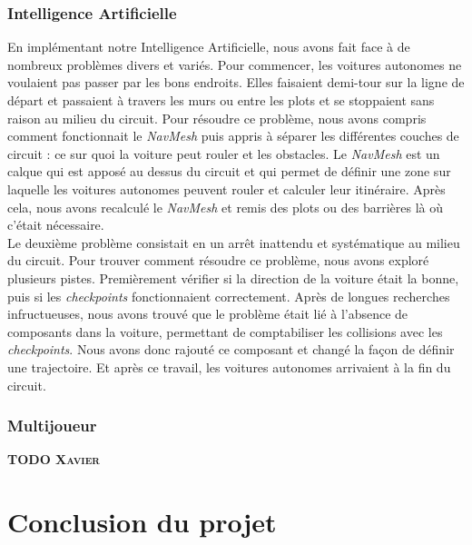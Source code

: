 \documentclass[a4paper,12pt]{article}
\newcommand{\AI}{Intelligence Artificielle}
\begin{document}
            \subsubsection{\AI}
                En implémentant notre \AI, nous avons fait face à de nombreux problèmes divers et variés. Pour 
                commencer, les voitures autonomes ne voulaient pas passer par les bons endroits. Elles 
                faisaient demi-tour sur la ligne de départ et passaient à travers les murs ou entre les 
                plots et se stoppaient sans raison au milieu du circuit. Pour résoudre ce problème, nous
                avons compris comment fonctionnait le \textit{NavMesh} puis appris à séparer les 
                différentes couches de circuit : ce sur quoi la voiture peut rouler et les obstacles. Le 
                \textit{NavMesh} est un calque qui est apposé au dessus du circuit et qui permet de
                définir une zone sur laquelle les voitures autonomes peuvent rouler et calculer leur
                itinéraire. Après cela, nous avons recalculé le \textit{NavMesh} et remis des plots
                ou des barrières là où c'était nécessaire.\\
                Le deuxième problème consistait en un arrêt inattendu et systématique au milieu du 
                circuit. Pour trouver comment résoudre ce problème, nous avons exploré plusieurs pistes. Premièrement vérifier si la direction de la voiture était la bonne, puis si les 
                \textit{checkpoints} fonctionnaient correctement. Après de longues recherches 
                infructueuses, nous avons trouvé que le problème était lié à l'absence de composants 
                dans la voiture, permettant de comptabiliser les collisions avec les 
                \textit{checkpoints}. Nous avons donc rajouté ce composant et changé la façon de définir
                une trajectoire. Et après ce travail, les voitures autonomes arrivaient à la fin du 
                circuit.

            \subsubsection{Multijoueur}
                \textsc{\bfseries TODO Xavier}
                \lipsum[37-38]
    


    \section*{Conclusion du projet}
\end{document}
